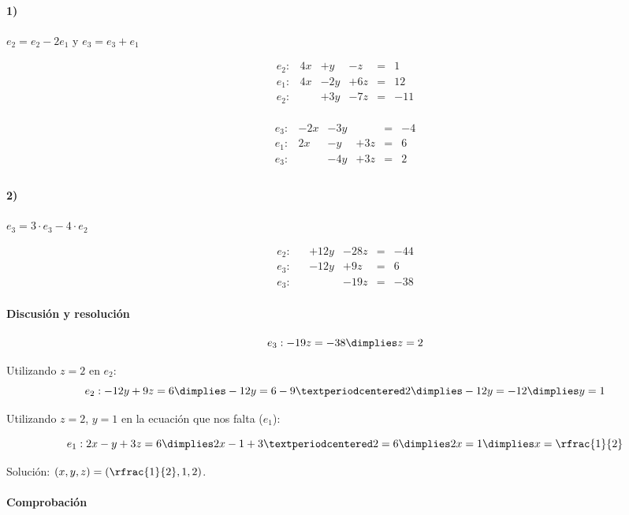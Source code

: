 \documentclass[palatino,nosec,nochap]{Docencia}
\begin{document}
\begin{problem}
\paragraph{1)} $e_2 = e_2-2e_1$ y $e_3 = e_3+e_1$

\[
\begin{array}{rccccc}
e_2: &	4x &	+	y &		-z &	= & 1 \\
e_1: &	4x &	-	2y &	+6z &	= & 12 \\
\hline
e_2: &	   &	+	3y &	-7z &	= & -11\\
\end{array}
\]	


\[
\begin{array}{rccccc}
e_3: &	-2x &	-  3y &		 &	= & -4 \\
e_1: &	2x &	-	y &		+3z &	= & 6 \\
\hline
e_3: &  &	 	-4y &	+3z &	= & 2\\
\end{array}
\]	


\paragraph{2)} $e_3 = 3·e_3-4·e_2$

\[
\begin{array}{rccccc}
e_2: &	   &	+	12y &	-28z &	= & -44\\
e_3: &  &	 	-12y &	+9z &	= & 6\\
\hline
e_3: &	   &		   &	- 19z & = & -38
\end{array}
\]	


\paragraph{Discusión y resolución}

\[e_3: -19z=-38 \dimplies z=2\]


Utilizando $z=2$ en $e_2$:
\[
e_2: -12y + 9z = 6 \dimplies -12y = 6-9·2 \dimplies -12y = -12 \dimplies y=1\]

Utilizando $z=2$, $y=1$ en la ecuación que nos falta ($e_1$):

\[
e_1: 2x	- y +3z = 6 \dimplies 2x - 1 + 3·2 = 6 \dimplies 2x = 1 \dimplies x=\rfrac{1}{2}
\]


Solución: $(x,y,z) = \left(\rfrac{1}{2},1,2\right)$.

\paragraph{Comprobación}


\end{problem}
\end{document}
